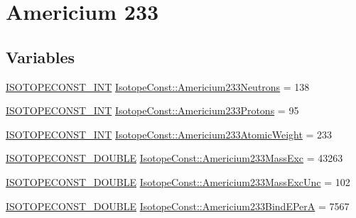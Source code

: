 \hypertarget{group___isotope_const-_americium-_am233}{}\section{Americium 233}
\label{group___isotope_const-_americium-_am233}
\subsection*{Variables}
\begin{DoxyCompactItemize}
\item 
\mbox{\hyperlink{group___isotope_const-_macros_ga5f18360b3e99483a35c32d789e62621c}{I\+S\+O\+T\+O\+P\+E\+C\+O\+N\+S\+T\+\_\+\+I\+NT}} \mbox{\hyperlink{group___isotope_const-_americium-_am233_gad1c474a6c33e84d248d11b6d71c202a8}{Isotope\+Const\+::\+Americium233\+Neutrons}} = 138
\item 
\mbox{\hyperlink{group___isotope_const-_macros_ga5f18360b3e99483a35c32d789e62621c}{I\+S\+O\+T\+O\+P\+E\+C\+O\+N\+S\+T\+\_\+\+I\+NT}} \mbox{\hyperlink{group___isotope_const-_americium-_am233_ga0ecf591fb3292f89a7dedc437a757d9c}{Isotope\+Const\+::\+Americium233\+Protons}} = 95
\item 
\mbox{\hyperlink{group___isotope_const-_macros_ga5f18360b3e99483a35c32d789e62621c}{I\+S\+O\+T\+O\+P\+E\+C\+O\+N\+S\+T\+\_\+\+I\+NT}} \mbox{\hyperlink{group___isotope_const-_americium-_am233_ga3653d8f7069c15fb21db2a1b3774d746}{Isotope\+Const\+::\+Americium233\+Atomic\+Weight}} = 233
\item 
\mbox{\hyperlink{group___isotope_const-_macros_ga8f45a7272ce02c0b4c65c44636ed719a}{I\+S\+O\+T\+O\+P\+E\+C\+O\+N\+S\+T\+\_\+\+D\+O\+U\+B\+LE}} \mbox{\hyperlink{group___isotope_const-_americium-_am233_ga3d1a86d5bfacb962c81e715ead07deb9}{Isotope\+Const\+::\+Americium233\+Mass\+Exc}} = 43263
\item 
\mbox{\hyperlink{group___isotope_const-_macros_ga8f45a7272ce02c0b4c65c44636ed719a}{I\+S\+O\+T\+O\+P\+E\+C\+O\+N\+S\+T\+\_\+\+D\+O\+U\+B\+LE}} \mbox{\hyperlink{group___isotope_const-_americium-_am233_gaf5799d9188749d427b9b87a5a7954f40}{Isotope\+Const\+::\+Americium233\+Mass\+Exc\+Unc}} = 102
\item 
\mbox{\hyperlink{group___isotope_const-_macros_ga8f45a7272ce02c0b4c65c44636ed719a}{I\+S\+O\+T\+O\+P\+E\+C\+O\+N\+S\+T\+\_\+\+D\+O\+U\+B\+LE}} \mbox{\hyperlink{group___isotope_const-_americium-_am233_gab38863b26cc5396e70076c26e6c8fda3}{Isotope\+Const\+::\+Americium233\+Bind\+E\+PerA}} = 7567
\item 

\end{DoxyCompactItemize}
